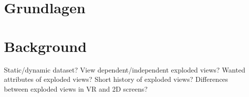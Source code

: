 {\chapter{Grundlagen}}
{\chapter{Background}}
\label{sec:background}


Static/dynamic dataset?
View dependent/independent exploded views?
Wanted attributes of exploded views? 
Short history of exploded views?
Differences between exploded views in VR and 2D screens? 

